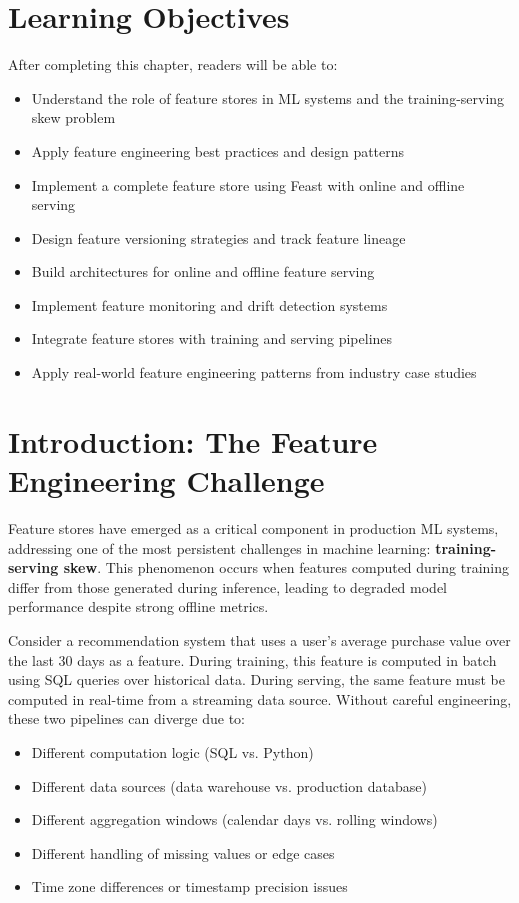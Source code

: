 \section{Learning Objectives}

After completing this chapter, readers will be able to:
\begin{itemize}
    \item Understand the role of feature stores in ML systems and the training-serving skew problem
    \item Apply feature engineering best practices and design patterns
    \item Implement a complete feature store using Feast with online and offline serving
    \item Design feature versioning strategies and track feature lineage
    \item Build architectures for online and offline feature serving
    \item Implement feature monitoring and drift detection systems
    \item Integrate feature stores with training and serving pipelines
    \item Apply real-world feature engineering patterns from industry case studies
\end{itemize}

\section{Introduction: The Feature Engineering Challenge}

Feature stores have emerged as a critical component in production ML systems, addressing one of the most persistent challenges in machine learning: \textbf{training-serving skew}. This phenomenon occurs when features computed during training differ from those generated during inference, leading to degraded model performance despite strong offline metrics.

Consider a recommendation system that uses a user's average purchase value over the last 30 days as a feature. During training, this feature is computed in batch using SQL queries over historical data. During serving, the same feature must be computed in real-time from a streaming data source. Without careful engineering, these two pipelines can diverge due to:

\begin{itemize}
    \item Different computation logic (SQL vs. Python)
    \item Different data sources (data warehouse vs. production database)
    \item Different aggregation windows (calendar days vs. rolling windows)
    \item Different handling of missing values or edge cases
    \item Time zone differences or timestamp precision issues
\end{itemize}

